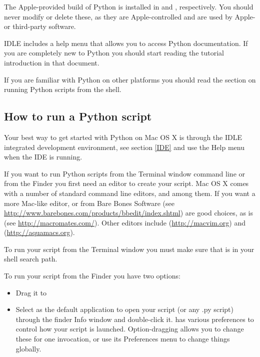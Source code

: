 The Apple-provided build of Python is installed in
 and ,
respectively. You should never modify or delete these, as they are
Apple-controlled and are used by Apple- or third-party software.

IDLE includes a help menu that allows you to access Python documentation. If you
are completely new to Python you should start reading the tutorial introduction
in that document.

If you are familiar with Python on other \UNIX{} platforms you should read the
section on running Python scripts from the \UNIX{} shell.


\subsection{How to run a Python script}

Your best way to get started with Python on Mac OS X is through the IDLE
integrated development environment, see section \ref{IDE} and use the Help menu
when the IDE is running.

If you want to run Python scripts from the Terminal window command line or from
the Finder you first need an editor to create your script. Mac OS X comes with a
number of standard \UNIX{} command line editors,  and
 among them. If you want a more Mac-like editor, 
or  from Bare Bones Software (see
\url{http://www.barebones.com/products/bbedit/index.shtml}) are good choices, as
is  (see \url{http://macromates.com/}). Other editors include
 (\url{http://macvim.org}) and 
(\url{http://aquamacs.org}).

To run your script from the Terminal window you must make sure that
 is in your shell search path.

To run your script from the Finder you have two options:

\begin{itemize}
\item Drag it to 
\item Select  as the default application to open your
  script (or any .py script) through the finder Info window and double-click it.
   has various preferences to control how your script is
  launched. Option-dragging allows you to change these for one invocation, or
  use its Preferences menu to change things globally.
\end{itemize}


